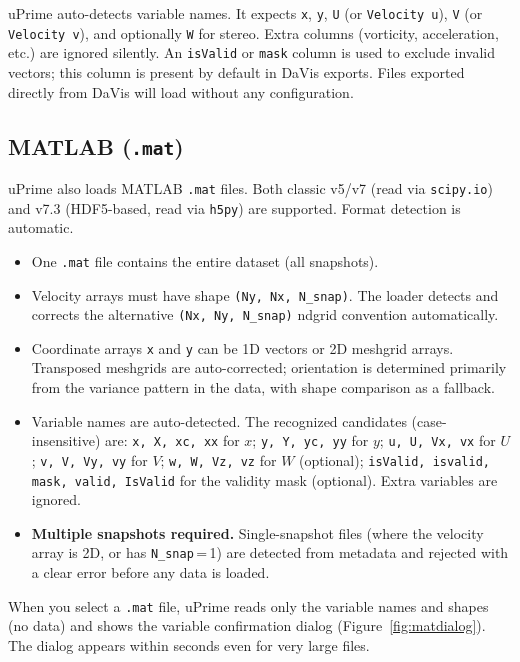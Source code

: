 \documentclass[11pt, a4paper]{report}
\newcommand{\software}[1]{\textsf{#1}}
\begin{document}
\begin{notebox}
\software{uPrime} auto-detects variable names. It expects \texttt{x}, \texttt{y}, \texttt{U} (or \texttt{Velocity u}), \texttt{V} (or \texttt{Velocity v}), and optionally \texttt{W} for stereo. Extra columns (vorticity, acceleration, etc.) are ignored silently. An \texttt{isValid} or \texttt{mask} column is used to exclude invalid vectors; this column is present by default in DaVis exports. Files exported directly from DaVis will load without any configuration.
\end{notebox}

\subsection{MATLAB (\texttt{.mat})}
\label{sec:matformat}

\software{uPrime} also loads MATLAB \texttt{.mat} files. Both classic v5/v7 (read via \texttt{scipy.io}) and v7.3 (HDF5-based, read via \texttt{h5py}) are supported. Format detection is automatic.

\begin{itemize}[leftmargin=1.5em]
  \item One \texttt{.mat} file contains the entire dataset (all snapshots).
  \item Velocity arrays must have shape \texttt{(Ny, Nx, N\_snap)}. The loader detects and corrects the alternative \texttt{(Nx, Ny, N\_snap)} ndgrid convention automatically.
  \item Coordinate arrays \texttt{x} and \texttt{y} can be 1D vectors or 2D meshgrid arrays. Transposed meshgrids are auto-corrected; orientation is determined primarily from the variance pattern in the data, with shape comparison as a fallback.
  \item Variable names are auto-detected. The recognized candidates (case-insensitive) are: \texttt{x, X, xc, xx} for $x$; \texttt{y, Y, yc, yy} for $y$; \texttt{u, U, Vx, vx} for $U$; \texttt{v, V, Vy, vy} for $V$; \texttt{w, W, Vz, vz} for $W$ (optional); \texttt{isValid, isvalid, mask, valid, IsValid} for the validity mask (optional). Extra variables are ignored.
  \item \textbf{Multiple snapshots required.} Single-snapshot files (where the velocity array is 2D, or has \texttt{N\_snap}\,=\,1) are detected from metadata and rejected with a clear error before any data is loaded.
\end{itemize}

When you select a \texttt{.mat} file, \software{uPrime} reads only the variable names and shapes (no data) and shows the variable confirmation dialog (Figure~\ref{fig:matdialog}). The dialog appears within seconds even for very large files.
\end{document}
